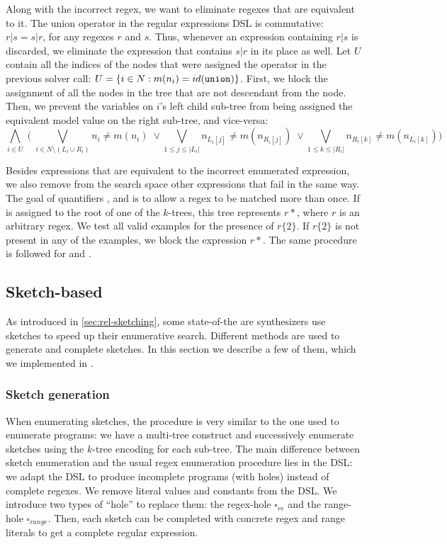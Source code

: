 \noindent
Along with the incorrect regex, we want to eliminate regexes that are equivalent to it. The union operator in the regular expressions DSL is commutative: \(r|s = s|r\), for any regexes \(r\) and \(s\). Thus, whenever an expression containing \(r|s\) is discarded, we eliminate the expression that contains \(s|r\) in its place as well.
%
Let \(U\) contain all the indices of the nodes that were assigned the \Union{} operator in the previous solver call: \(U = \{i \in N: m(n_i) = id(\texttt{union}{})\}\). First, we block the assignment of all the nodes in the tree that are not descendant from the \Union{} node. Then, we prevent the variables on \(i\)'s left child sub-tree from being assigned the equivalent model value on the right sub-tree, and vice-versa:
\begin{equation}
\bigwedge_{i \in U} \;\Biggl(\;
\bigvee_{i \in N \setminus (L_i \cup R_i)} n_i \ne m(n_i) \;\lor
\bigvee_{1 \le j \le |L_i|} n_{L_i[j]} \ne m(n_{R_i[j]}) \;\lor
\bigvee_{1 \le k \le |R_i|} n_{R_i[k]} \ne m(n_{L_i[k]}) \Biggr)
\end{equation}

\noindent
Besides expressions that are equivalent to the incorrect enumerated expression, we also remove from the search space other expressions that fail in the same way. The goal of quantifiers \Kleene{}, \Posit{} and \Range{} is to allow a regex to be matched more than once. If \Kleene{} is assigned to the root of one of the \(k\)-trees, this tree represents \(r*\), where \(r\) is an arbitrary regex. We test all valid examples for the presence of \(r\{2\}\). If \(r\{2\}\) is not present in any of the examples, we block the expression \(r*\). The same procedure is followed for \Posit{} and \Range{}.

\subsection{Sketch-based}\label{sec:regex-sketches}

As introduced in \autoref{sec:rel-sketching}, some state-of-the are synthesizers use sketches to speed up their enumerative search. Different methods are used to generate and complete sketches. In this section we describe a few of them, which we implemented in \Forest{}.

\subsubsection{Sketch generation}

When enumerating sketches, the procedure is very similar to the one used to enumerate programs: we have a multi-tree construct and successively enumerate sketches using the \(k\)-tree encoding for each sub-tree. 
The main difference between sketch enumeration and the usual regex enumeration procedure lies in the \ac{DSL}: we adapt the \ac{DSL} to produce incomplete programs (with holes) instead of complete regexes. 
We remove literal values and constants from the \ac{DSL}. We introduce two types of ``hole'' to replace them: the regex-hole \(\square_{\textit{re}}\) and the range-hole \(\square_{\textit{range}}\). Then, each sketch can be completed with concrete regex and range literals to get a complete regular expression.

